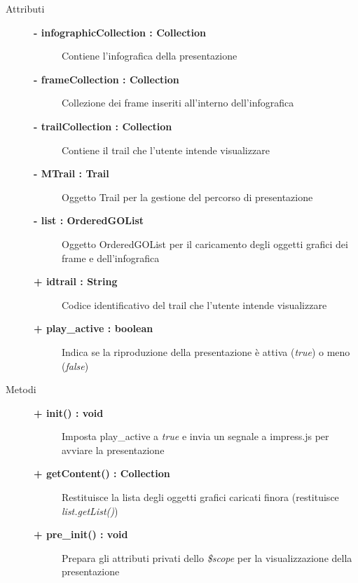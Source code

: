 \begin{description}
	
\item[Attributi] \hfill
	\begin{description}
		\item[\textbf{- infographicCollection : Collection			}] \hfill
			Contiene l'infografica della presentazione
		\item[\textbf{- frameCollection : Collection			}] \hfill
			Collezione dei frame inseriti all'interno dell'infografica
		\item[\textbf{- trailCollection : Collection			}] \hfill
			Contiene il trail che l'utente intende visualizzare
		\item[\textbf{- MTrail : Trail			}] \hfill
			Oggetto Trail per la gestione del percorso di presentazione
		\item[\textbf{- list : OrderedGOList			}] \hfill
			Oggetto OrderedGOList per il caricamento degli oggetti grafici dei frame e dell'infografica
		\item[\textbf{+ idtrail : String			}] \hfill
			Codice identificativo del trail che l'utente intende visualizzare
		\item[\textbf{+ play\_active : boolean			}] \hfill
			Indica se la riproduzione della presentazione è attiva (\textit{true}) o meno (\textit{false})
	\end{description}
	
	
\item[Metodi] \hfill

	\begin{description}
		\item[\textbf{\color{blue}+ init() : void			}] \hfill
			Imposta play\_active a \textit{true} e invia un segnale a impress.js per avviare la presentazione
			
	\end{description}
	
	\begin{description}
		\item[\textbf{\color{blue}+ getContent() : Collection			}] \hfill
			Restituisce la lista degli oggetti grafici caricati finora (restituisce \textit{list.getList()})
			
	\end{description}
	
	\begin{description}
		\item[\textbf{\color{blue}+ pre\_init() : void			}] \hfill
			Prepara gli attributi privati dello \textit{\$scope} per la visualizzazione della presentazione
			

\end{description}
\end{description}
